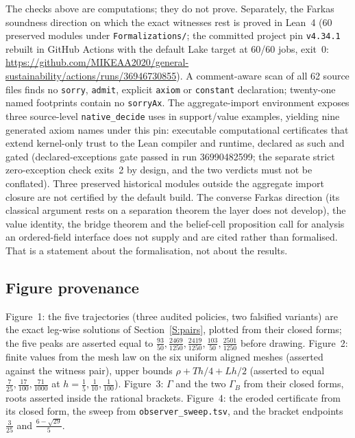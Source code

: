 \documentclass[11pt,a4paper]{article}
\theoremstyle{plain}
\theoremstyle{definition}
\theoremstyle{remark}
\newcommand{\tfr}[2]{\tfrac{#1}{#2}}
\begin{document}
The checks above are computations; they do not prove. Separately, the Farkas soundness direction on which the exact witnesses rest is proved in Lean~4 (60 preserved modules under \texttt{Formalizations/}; the committed project pin \texttt{v4.34.1} rebuilt in GitHub Actions with the default Lake target at 60/60 jobs, exit~0: \url{https://github.com/MIKEAA2020/general-sustainability/actions/runs/36946730855}). A comment-aware scan of all 62 source files finds no \texttt{sorry}, \texttt{admit}, explicit \texttt{axiom} or \texttt{constant} declaration; twenty-one named footprints contain no \texttt{sorryAx}. The aggregate-import environment exposes three source-level \texttt{native\_decide} uses in support/value examples, yielding nine generated axiom names under this pin: executable computational certificates that extend kernel-only trust to the Lean compiler and runtime, declared as such and gated (declared-exceptions gate passed in run 36990482599; the separate strict zero-exception check exits~2 by design, and the two verdicts must not be conflated). Three preserved historical modules outside the aggregate import closure are not certified by the default build. The converse Farkas direction (its classical argument rests on a separation theorem the layer does not develop), the value identity, the bridge theorem and the belief-cell proposition call for analysis an ordered-field interface does not supply and are cited rather than formalised. That is a statement about the formalisation, not about the results.

\subsection{Figure provenance}

Figure~1: the five trajectories (three audited policies, two falsified variants) are the exact leg-wise solutions of Section~\ref{S:pairs}, plotted from their closed forms; the five peaks are asserted equal to $\tfr{93}{50},\tfr{2469}{1250},\tfr{2419}{1250},\tfr{103}{50},\tfr{2501}{1250}$ before drawing. Figure~2: finite values from the mesh law on the six uniform aligned meshes (asserted against the witness pair), upper bounds $\rho+Th/4+Lh/2$ (asserted to equal $\tfr7{25},\tfr{17}{100},\tfr{71}{1000}$ at $h=\tfr15,\tfr1{10},\tfr1{100}$). Figure~3: $\Gamma$ and the two $\Gamma_B$ from their closed forms, roots asserted inside the rational brackets. Figure~4: the eroded certificate from its closed form, the sweep from \texttt{observer\_sweep.tsv}, and the bracket endpoints $\tfr3{25}$ and $\tfr{6-\sqrt{29}}5$.
\end{document}

